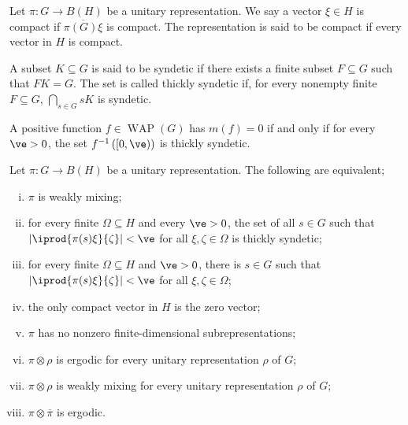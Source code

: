 \documentclass[10pt]{mypackage}
\begin{document}
\begin{definition}
  Let $\pi\colon G\rightarrow B\left( H \right)$ be a unitary representation. We say a vector $\xi\in H$ is compact if $ \overline{\pi(G)\xi} $ is compact. The representation is said to be compact if every vector in $H$ is compact.
\end{definition}
\begin{definition}
  A subset $K\subseteq G$ is said to be syndetic if there exists a finite subset $F\subseteq G$ such that $FK = G$. The set is called thickly syndetic if, for every nonempty finite $F\subseteq G$, $ \bigcap_{s\in G}sK $ is syndetic.
\end{definition}
\begin{proposition}
  A positive function $f\in \operatorname{WAP}\left( G \right)$ has $m\left( f \right) = 0$ if and only if for every $\ve > 0$, the set $f^{-1}\left( \left[ 0,\ve \right) \right)$ is thickly syndetic.
\end{proposition}
\begin{theorem}
  Let $\pi\colon G\rightarrow B\left( H \right)$ be a unitary representation. The following are equivalent;
  \begin{enumerate}[(i)]
    \item $\pi$ is weakly mixing;
    \item for every finite $\Omega\subseteq H$ and every $\ve > 0$, the set of all $s\in G$ such that $ \left\vert \iprod{\pi(s)\xi}{\zeta} \right\vert < \ve $ for all $\xi,\zeta\in \Omega$ is thickly syndetic;
    \item for every finite $\Omega\subseteq H$ and $\ve > 0$, there is $s\in G$ such that $ \left\vert \iprod{\pi(s)\xi}{\zeta} \right\vert < \ve $ for all $\xi,\zeta\in \Omega$;
    \item the only compact vector in $H$ is the zero vector;
    \item $\pi$ has no nonzero finite-dimensional subrepresentations;
    \item $\pi\otimes\rho$ is ergodic for every unitary representation $\rho$ of $G$;
    \item $\pi\otimes\rho$ is weakly mixing for every unitary representation $\rho$ of $G$;
    \item $\pi\otimes \overline{\pi}$ is ergodic.
  \end{enumerate}
\end{theorem}
\end{document}
